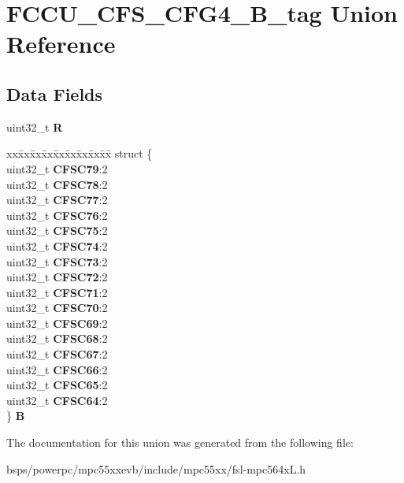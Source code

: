 \hypertarget{unionFCCU__CFS__CFG4__32B__tag}{}\section{F\+C\+C\+U\+\_\+\+C\+F\+S\+\_\+\+C\+F\+G4\+\_\+B\+\_\+tag Union Reference}
\label{unionFCCU__CFS__CFG4__32B__tag}
\subsection*{Data Fields}
\begin{DoxyCompactItemize}
\item 
\mbox{\label{unionFCCU__CFS__CFG4__32B__tag_a40697db54263029fe1da8e1e84c245d6}} 
uint32\+\_\+t {\bfseries R}
\item 
\mbox{\label{unionFCCU__CFS__CFG4__32B__tag_a760ba24bd664651bf51d41edf0b82813}} 
\begin{tabbing}
xx\=xx\=xx\=xx\=xx\=xx\=xx\=xx\=xx\=\kill
struct \{\\
\>uint32\_t {\bfseries CFSC79}:2\\
\>uint32\_t {\bfseries CFSC78}:2\\
\>uint32\_t {\bfseries CFSC77}:2\\
\>uint32\_t {\bfseries CFSC76}:2\\
\>uint32\_t {\bfseries CFSC75}:2\\
\>uint32\_t {\bfseries CFSC74}:2\\
\>uint32\_t {\bfseries CFSC73}:2\\
\>uint32\_t {\bfseries CFSC72}:2\\
\>uint32\_t {\bfseries CFSC71}:2\\
\>uint32\_t {\bfseries CFSC70}:2\\
\>uint32\_t {\bfseries CFSC69}:2\\
\>uint32\_t {\bfseries CFSC68}:2\\
\>uint32\_t {\bfseries CFSC67}:2\\
\>uint32\_t {\bfseries CFSC66}:2\\
\>uint32\_t {\bfseries CFSC65}:2\\
\>uint32\_t {\bfseries CFSC64}:2\\
\} {\bfseries B}\\

\end{tabbing}\end{DoxyCompactItemize}


The documentation for this union was generated from the following file\+:\begin{DoxyCompactItemize}
\item 
bsps/powerpc/mpc55xxevb/include/mpc55xx/fsl-\/mpc564x\+L.\+h\end{DoxyCompactItemize}
